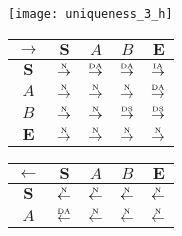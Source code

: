 \begin{figure}[htbp]\ContinuedFloat
  \centering
  \begin{subfigure}{1\textwidth}
    \centering
    \begin{minipage}[b]{1\textwidth}
      \centering
      \texttt{[image: uniqueness\_3\_h]}
    \end{minipage}
    \begin{minipage}[b]{0.3\textwidth}
      \vspace{1em}
      \centering
      \begin{tabular}{|c|c|c|c|c|} \hline
        $\rightarrow$ & $\bm{S}$ & $A$ & $B$ & $\bm{E}$\\ \hline
        $\bm{S}$ & $\overset{\text{\tiny{N}}}{\rightarrow}$ & $\overset{\text{\tiny{DA}}}{\rightarrow}$ & $\overset{\text{\tiny{DA}}}{\rightarrow}$ & $\overset{\text{\tiny{IA}}}{\rightarrow}$\\ \hline
        $A$ & $\overset{\text{\tiny{N}}}{\rightarrow}$ & $\overset{\text{\tiny{N}}}{\rightarrow}$ & $\overset{\text{\tiny{N}}}{\rightarrow}$ & $\overset{\text{\tiny{DA}}}{\rightarrow}$\\ \hline
        $B$ & $\overset{\text{\tiny{N}}}{\rightarrow}$ & $\overset{\text{\tiny{N}}}{\rightarrow}$ & $\overset{\text{\tiny{DS}}}{\rightarrow}$ & $\overset{\text{\tiny{DS}}}{\rightarrow}$\\ \hline
        $\bm{E}$ & $\overset{\text{\tiny{N}}}{\rightarrow}$ & $\overset{\text{\tiny{N}}}{\rightarrow}$ & $\overset{\text{\tiny{N}}}{\rightarrow}$ & $\overset{\text{\tiny{N}}}{\rightarrow}$\\ \hline
      \end{tabular}
    \end{minipage}
    \begin{minipage}[b]{0.3\textwidth}
      \vspace{1em}
      \centering
      \begin{tabular}{|c|c|c|c|c|} \hline
        $\leftarrow$ & $\bm{S}$ & $A$ & $B$ & $\bm{E}$\\ \hline
        $\bm{S}$ & $\overset{\text{\tiny{N}}}{\leftarrow}$ & $\overset{\text{\tiny{N}}}{\leftarrow}$ & $\overset{\text{\tiny{N}}}{\leftarrow}$ & $\overset{\text{\tiny{N}}}{\leftarrow}$\\ \hline
        $A$ & $\overset{\text{\tiny{DA}}}{\leftarrow}$ & $\overset{\text{\tiny{N}}}{\leftarrow}$ & $\overset{\text{\tiny{N}}}{\leftarrow}$ & $\overset{\text{\tiny{N}}}{\leftarrow}$\\ \hline

\end{tabular}
\end{minipage}
\end{subfigure}
\end{figure}

